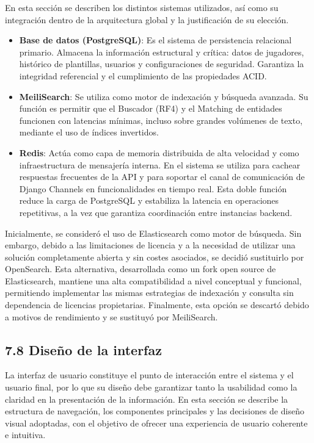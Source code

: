 En esta sección se describen los distintos sistemas utilizados, así como su
integración dentro de la arquitectura global y la justificación de su elección.

\begin{itemize}
\item \textbf{Base de datos (PostgreSQL)}: Es el sistema de persistencia
relacional primario. Almacena la información estructural y crítica: datos de
jugadores, histórico de plantillas, usuarios y configuraciones de seguridad.
Garantiza la integridad referencial y el cumplimiento de las propiedades ACID.

\item \textbf{MeiliSearch}: Se utiliza como motor de indexación y búsqueda
avanzada. Su función es permitir que el Buscador (RF4) y el Matching de
entidades funcionen con latencias mínimas, incluso sobre grandes volúmenes de
texto, mediante el uso de índices invertidos.

\item \textbf{Redis}: Actúa como capa de memoria distribuida de alta velocidad y
como infraestructura de mensajería interna. En el sistema se utiliza para
cachear respuestas frecuentes de la API y para soportar el canal de comunicación
de Django Channels en funcionalidades en tiempo real. Esta doble función reduce
la carga de PostgreSQL y estabiliza la latencia en operaciones repetitivas, a la
vez que garantiza coordinación entre instancias backend.
\end{itemize}

Inicialmente, se consideró el uso de Elasticsearch como motor de búsqueda. Sin
embargo, debido a las limitaciones de licencia y a la necesidad de utilizar una
solución completamente abierta y sin costes asociados, se decidió sustituirlo
por OpenSearch. Esta alternativa, desarrollada como un fork open source de
Elasticsearch, mantiene una alta compatibilidad a nivel conceptual y funcional,
permitiendo implementar las mismas estrategias de indexación y consulta sin
dependencia de licencias propietarias. Finalmente, esta opción se descartó debido
 a motivos de rendimiento y se sustituyó por MeiliSearch.


\subsection{7.8 Diseño de la interfaz}
La interfaz de usuario constituye el punto de interacción entre el sistema y el
usuario final, por lo que su diseño debe garantizar tanto la usabilidad como la
claridad en la presentación de la información.
En esta sección se describe la estructura de navegación, los componentes
principales y las decisiones de diseño visual adoptadas, con el objetivo de
ofrecer una experiencia de usuario coherente e intuitiva.

